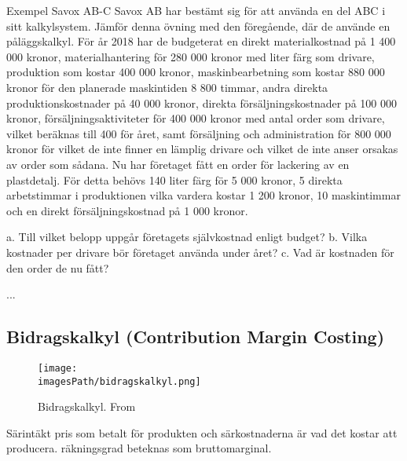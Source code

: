 \begin{exampleblock}{Exempel Savox AB-C}
    Savox AB har bestämt sig för att använda en del ABC i sitt kalkylsystem. Jämför 
    denna övning med den föregående, där de använde en påläggskalkyl. För år 2018 har de 
    budgeterat en direkt materialkostnad på 1 400 000 kronor, materialhantering för 280 000 
    kronor med liter färg som drivare, produktion som kostar 400 000 kronor, maskinbearbetning 
    som kostar 880 000 kronor för den planerade maskintiden 8 800 timmar, andra direkta 
    produktionskostnader på 40 000 kronor, direkta försäljningskostnader på 100 000 kronor, 
    försäljningsaktiviteter för 400 000 kronor med antal order som drivare, vilket beräknas till 400 för 
    året, samt försäljning och administration för 800 000 kronor för vilket de inte finner en lämplig 
    drivare och vilket de inte anser orsakas av order som sådana. Nu har företaget fått en order för 
    lackering av en plastdetalj. För detta behövs 140 liter färg för 5 000 kronor, 5 direkta arbetstimmar i 
    produktionen vilka vardera kostar 1 200 kronor, 10 maskintimmar och en direkt försäljningskostnad 
    på 1 000 kronor.

    a. Till vilket belopp uppgår företagets självkostnad enligt budget?
    b. Vilka kostnader per drivare bör företaget använda under året? 
    c. Vad är kostnaden för den order de nu fått? 

   ... %
\end{exampleblock}
%


\newpage
\subsection{Bidragskalkyl (Contribution Margin Costing)}
\begin{figure}[!ht]
    \centering
    \texttt{[image: \\imagesPath/bidragskalkyl.png]}
    \caption{Bidragskalkyl. From \cite{}}
\end{figure}
Särintäkt pris som betalt för produkten och särkostnaderna är vad det kostar att producera.
räkningsgrad beteknas som bruttomarginal.

